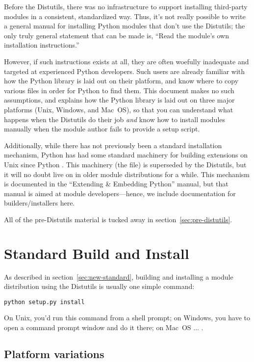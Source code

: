 \documentclass{howto}
\begin{document}
Before the Distutils, there was no infrastructure to support installing
third-party modules in a consistent, standardized way.  Thus, it's not
really possible to write a general manual for installing Python modules
that don't use the Distutils; the only truly general statement that can
be made is, ``Read the module's own installation instructions.''

However, if such instructions exists at all, they are often woefully
inadequate and targeted at experienced Python developers.  Such users
are already familiar with how the Python library is laid out on their
platform, and know where to copy various files in order for Python to
find them.  This document makes no such assumptions, and explains how
the Python library is laid out on three major platforms (Unix, Windows,
and Mac~OS), so that you can understand what happens when the Distutils
do their job \emph{and} know how to install modules manually when the
module author fails to provide a setup script.

Additionally, while there has not previously been a standard
installation mechanism, Python has had some standard machinery for
building extensions on Unix since Python .  This machinery
(the  file) is superseded by the Distutils, but it
will no doubt live on in older module distributions for a while.  This
 mechanism is documented in the ``Extending \&
Embedding Python'' manual, but that manual is aimed at module
developers---hence, we include documentation for builders/installers
here.

All of the pre-Distutils material is tucked away in
section~\ref{sec:pre-distutils}.


\section{Standard Build and Install}
\label{sec:normal-install}

As described in section~\ref{sec:new-standard}, building and installing
a module distribution using the Distutils is usually one simple command:
\begin{verbatim}
python setup.py install
\end{verbatim}
On Unix, you'd run this command from a shell prompt; on Windows, you
have to open a command prompt window and do it there; on Mac~OS ...
.


\subsection{Platform variations}
\end{document}
